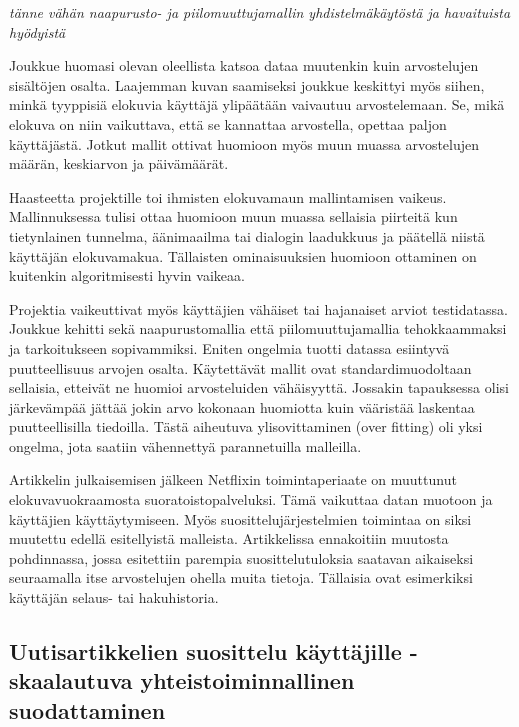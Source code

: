 \documentclass[12pt,finnish]{tktltiki2}
\theoremstyle{definition}
\theoremstyle{remark}
\begin{document}
        \textit{tänne vähän naapurusto- ja piilomuuttujamallin yhdistelmäkäytöstä ja havaituista hyödyistä}
        
        Joukkue huomasi olevan oleellista katsoa dataa muutenkin kuin arvostelujen sisältöjen osalta. Laajemman kuvan saamiseksi joukkue keskittyi myös siihen, minkä tyyppisiä elokuvia käyttäjä ylipäätään vaivautuu arvostelemaan. Se, mikä elokuva on niin vaikuttava, että se kannattaa arvostella, opettaa paljon käyttäjästä. Jotkut mallit ottivat huomioon myös muun muassa arvostelujen määrän, keskiarvon ja päivämäärät.
        
Haasteetta projektille toi ihmisten elokuvamaun mallintamisen vaikeus. Mallinnuksessa tulisi ottaa huomioon muun muassa sellaisia piirteitä kun tietynlainen tunnelma, äänimaailma tai dialogin laadukkuus ja päätellä niistä käyttäjän elokuvamakua. Tällaisten ominaisuuksien huomioon ottaminen on kuitenkin algoritmisesti hyvin vaikeaa.
        
        Projektia vaikeuttivat myös käyttäjien vähäiset tai hajanaiset arviot testidatassa. Joukkue kehitti sekä naapurustomallia että piilomuuttujamallia tehokkaammaksi ja tarkoitukseen sopivammiksi. Eniten ongelmia tuotti datassa esiintyvä puutteellisuus arvojen osalta. Käytettävät mallit ovat standardimuodoltaan sellaisia, etteivät ne huomioi arvosteluiden vähäisyyttä. Jossakin tapauksessa olisi järkevämpää jättää jokin arvo kokonaan huomiotta kuin vääristää laskentaa puutteellisilla tiedoilla. Tästä aiheutuva ylisovittaminen (over fitting) oli yksi ongelma, jota saatiin vähennettyä parannetuilla malleilla.
        
Artikkelin julkaisemisen jälkeen Netflixin toimintaperiaate on muuttunut elokuvavuokraamosta suoratoistopalveluksi. Tämä vaikuttaa datan muotoon ja käyttäjien käyttäytymiseen. Myös suosittelujärjestelmien toimintaa on siksi muutettu edellä esitellyistä malleista. Artikkelissa ennakoitiin muutosta pohdinnassa, jossa esitettiin parempia suosittelutuloksia saatavan aikaiseksi seuraamalla itse arvostelujen ohella muita tietoja. Tällaisia ovat esimerkiksi käyttäjän selaus- tai hakuhistoria.~\cite{Bell:2007:LNP:1345448.1345465}

\subsection{Uutisartikkelien suosittelu käyttäjille - skaalautuva yhteistoiminnallinen suodattaminen}
\end{document}

